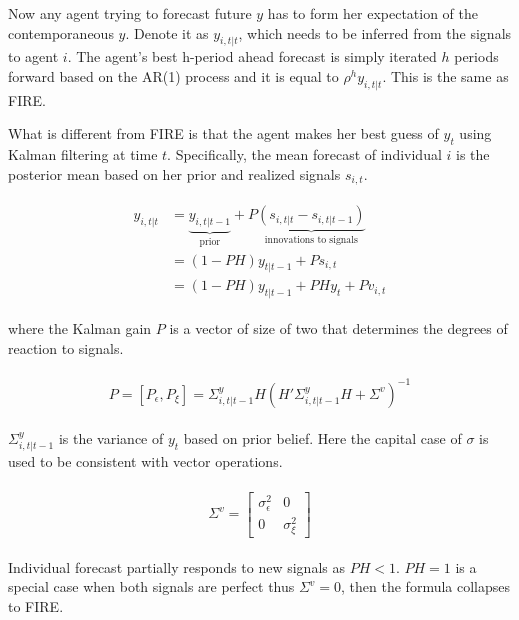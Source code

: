 \documentclass[]{article}
\begin{document}
	
	Now any agent trying to forecast future $y$ has to form her expectation of the contemporaneous $y$. Denote it as  $y_{i,t|t}$, which needs to be inferred from the signals to agent $i$. The agent's best h-period ahead forecast is simply iterated $h$ periods forward based on the AR(1) process and it is equal to $\rho^h y_{i,t|t}$. This is the same as FIRE.
	
	What is different from FIRE is that the agent makes her best guess of $y_t$ using Kalman filtering at time $t$. Specifically, the mean forecast of individual $i$ is the posterior mean based on her prior and realized signals $s_{i,t}$. 
	
	
	\begin{eqnarray}
		\begin{aligned}
			y_{i,t|t}  
			& =  \underbrace{y_{i,t|t-1}}_{\text{prior}} + P \underbrace {(s_{i,t|t}-s_{i,t|t-1})}_{\text{innovations to signals}} \\
			& = (1-PH) y_{t|t-1} + Ps_{i,t} \\
			& = (1-PH) y_{t|t-1} + PH y_{t} + P v_{i,t} 
		\end{aligned}
	\end{eqnarray}
	
	where the Kalman gain $P$ is a vector of size of two that determines the degrees of reaction to signals. 
	
	
	\begin{eqnarray}
		\begin{aligned}
			P = [P_\epsilon,P_\xi]= \Sigma^y_{i,t|t-1} H(H'\Sigma^y_{i,t|t-1} H + \Sigma^v)^{-1} 
		\end{aligned}
	\end{eqnarray}
	
	$\Sigma^y_{i,t|t-1}$  is the variance of  $y_t$ based on prior belief. Here the capital case of $\sigma$ is used to be consistent with vector operations. 
	
	\begin{eqnarray}
		\begin{aligned}
			\Sigma^v =  \left[ \begin{matrix} 
				\sigma^2_{\epsilon} &  0 \\ 
				0 & \sigma^2_\xi \end{matrix}\right] 
		\end{aligned}
	\end{eqnarray}
	
	Individual forecast partially responds to new signals as  $PH<1$. $PH=1$ is a special case when both signals are perfect thus $\Sigma^v = 0$, then the formula collapses to FIRE. 
	
\end{document}
